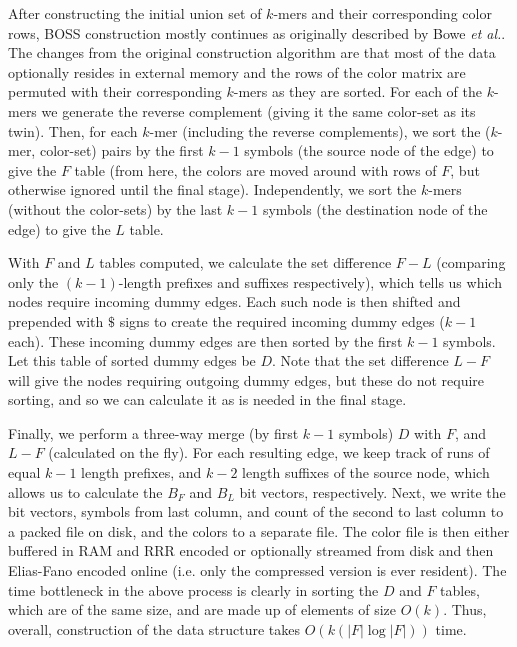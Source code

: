 
After constructing the initial union set of $k$-mers and their corresponding color rows, BOSS construction mostly continues as originally described by Bowe {\it et al.}.  The changes from the original construction algorithm are that most of the data optionally resides in external memory and the rows of the color matrix are permuted with their corresponding $k$-mers as they are sorted.  For each of the $k$-mers we generate the reverse complement (giving it the same color-set as its twin). Then, for each $k$-mer (including the reverse complements),
we sort the ($k$-mer, color-set) pairs by the first $k-1$ symbols (the source node of the edge) to give the $F$ table (from here, the colors are moved around with rows of $F$, but otherwise ignored until 
the final stage). Independently, we sort the $k$-mers (without the color-sets) by the last $k-1$ symbols (the destination node of the edge) to give the $L$ table.

With $F$ and $L$ tables computed, we calculate the set difference $F-L$ (comparing only the $(k-1)$-length prefixes and suffixes respectively), which tells us which nodes require incoming dummy edges. Each such node is then
shifted and prepended with $\$$ signs to create the required incoming dummy edges ($k-1$ each). These incoming dummy edges are then sorted by the first $k-1$ symbols.
Let this table of sorted dummy edges be $D$. Note that the set difference $L - F$ will give the nodes requiring outgoing dummy edges, but these do not require sorting, and so we can calculate it as is needed in the final stage.

Finally, we perform a three-way merge (by first $k-1$ symbols) $D$ with $F$, and $L-F$ (calculated on the fly). For each resulting edge, we keep track of runs of equal $k-1$ length prefixes,
and $k-2$ length suffixes of the source node, which allows us to calculate the $B_F$ and $B_L$ bit vectors, respectively. Next, we write the bit vectors, symbols from last column, and
count of the second to last column to a packed file on disk, and the colors to a separate file.   The color file is then either buffered in RAM and RRR encoded or optionally streamed from disk and then Elias-Fano encoded online (i.e. only the compressed version is ever resident).  The time bottleneck in the above process is clearly in sorting the $D$ and $F$ tables, which are of the same size, and are made up of elements of size $O(k)$. Thus, overall, construction of the data structure takes $O(k(|F|\log|F|))$ time.



